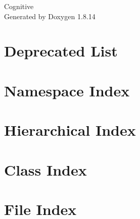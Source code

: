\documentclass[twoside]{book}
\newcommand{\+}{\discretionary{\mbox{\scriptsize$\hookleftarrow$}}{}{}}
\newcommand{\clearemptydoublepage}{%
  \newpage{\pagestyle{empty}\cleardoublepage}%
}
\begin{document}
\hypersetup{pageanchor=false,
             bookmarksnumbered=true,
             pdfencoding=unicode
            }
\begin{titlepage}
\vspace*{7cm}
\begin{center}%
{\Large Cognitive }\\
\vspace*{1cm}
{\large Generated by Doxygen 1.8.14}\\
\end{center}
\end{titlepage}
\clearemptydoublepage
{}
\tableofcontents
\clearemptydoublepage
{}
\hypersetup{pageanchor=true}

\chapter{Deprecated List}
\label{deprecated}

\chapter{Namespace Index}

\chapter{Hierarchical Index}

\chapter{Class Index}

\chapter{File Index}

\end{document}
